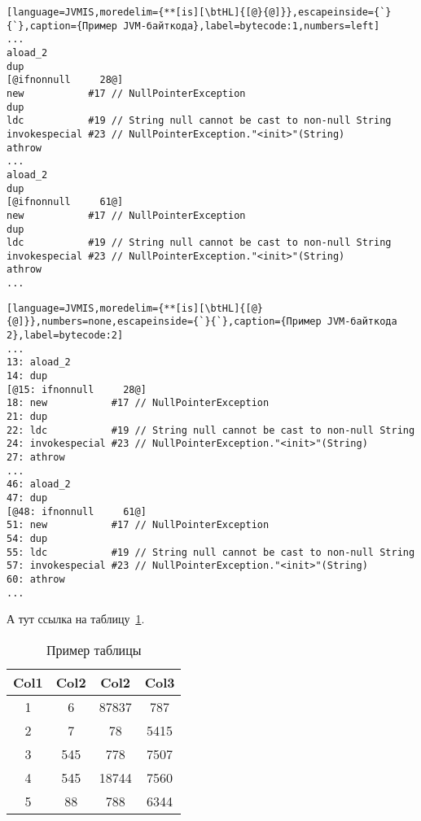 \begin{lstlisting}[language=JVMIS,moredelim={**[is][\btHL]{[@}{@]}},escapeinside={`}{`},caption={Пример JVM-байткода},label=bytecode:1,numbers=left]
...
aload_2
dup
[@ifnonnull     28@]
new           #17 // NullPointerException
dup
ldc           #19 // String null cannot be cast to non-null String
invokespecial #23 // NullPointerException."<init>"(String)
athrow
...
aload_2
dup
[@ifnonnull     61@]
new           #17 // NullPointerException
dup
ldc           #19 // String null cannot be cast to non-null String
invokespecial #23 // NullPointerException."<init>"(String)
athrow
...
\end{lstlisting}
\egroup

\begin{lstlisting}[language=JVMIS,moredelim={**[is][\btHL]{[@}{@]}},numbers=none,escapeinside={`}{`},caption={Пример JVM-байткода 2},label=bytecode:2]
...
13: aload_2
14: dup
[@15: ifnonnull     28@]
18: new           #17 // NullPointerException
21: dup
22: ldc           #19 // String null cannot be cast to non-null String
24: invokespecial #23 // NullPointerException."<init>"(String)
27: athrow
...
46: aload_2
47: dup
[@48: ifnonnull     61@]
51: new           #17 // NullPointerException
54: dup
55: ldc           #19 // String null cannot be cast to non-null String
57: invokespecial #23 // NullPointerException."<init>"(String)
60: athrow
...
\end{lstlisting}

А тут ссылка на таблицу~\ref{table:1}.

\begin{table}[h!]
\centering
\begin{tabular}{| c | c | c | c |} 
    \hline
    Col1 & Col2 & Col2 & Col3 \\ [0.5ex] 
    \hline
    1 & 6 & 87837 & 787 \\
    \hline
    2 & 7 & 78 & 5415 \\
    \hline
    3 & 545 & 778 & 7507 \\
    \hline
    4 & 545 & 18744 & 7560 \\
    \hline
    5 & 88 & 788 & 6344 \\
    \hline
\end{tabular}
\caption{Пример таблицы}
\label{table:1}
\end{table}
